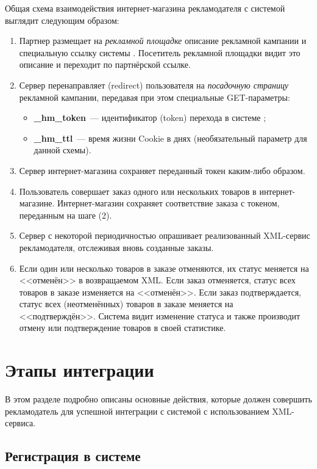 \documentclass[a4paper,12pt]{article}
\begin{document}
Общая схема взаимодействия интернет-магазина рекламодателя с системой \heymoose{} выглядит следующим образом:

\begin{enumerate}
\item Партнер размещает на \textit{рекламной площадке} описание рекламной кампании и специальную ссылку системы \heymoose. Посетитель рекламной площадки видит это описание и переходит по партнёрской ссылке.
\item Сервер \heymoose{} перенаправляет (redirect) пользователя на \textit{посадочную страницу} рекламной кампании, передавая при этом специальные GET-параметры:
	\begin{itemize}
	\item \textbf{\_hm\_token}~--- идентификатор (token) перехода в системе \heymoose{};
	\item \textbf{\_hm\_ttl}~--- время жизни Cookie в днях (необязательный параметр для данной схемы).
	\end{itemize}
\item Сервер интернет-магазина сохраняет переданный токен каким-либо образом.
\item Пользователь совершает заказ одного или нескольких товаров в интернет-магазине. Интернет-магазин сохраняет соответствие заказа с токеном, переданным на шаге (2).
\item Сервер \heymoose{} с некоторой периодичностью опрашивает реализованный XML-сервис рекламодателя, отслеживая вновь созданные заказы.
\item Если один или несколько товаров в заказе отменяются, их статус меняется на <<отменён>> в возвращаемом XML. Если заказ отменяется, статус всех товаров в заказе изменяется на <<отменён>>. Если заказ подтверждается, статус всех (неотменённых) товаров в заказе меняется на <<подтверждён>>. Система \heymoose{} видит изменение статуса и также производит отмену или подтверждение товаров в своей статистике.
\end{enumerate}

\section{Этапы интеграции}

В этом разделе подробно описаны основные действия, которые должен совершить рекламодатель для успешной интеграции с системой \heymoose{} с использованием XML-сервиса.

\subsection{Регистрация в системе \heymoose{}}
\end{document}
